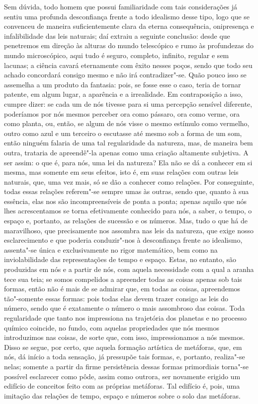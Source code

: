 Sem dúvida, todo homem que possui familiaridade com tais considerações
já sentiu uma profunda desconfiança frente a todo idealismo desse
tipo, logo que se convenceu de maneira suficientemente clara da eterna
consequência, onipresença e infalibilidade das leis naturais; daí 
extraiu a seguinte conclusão: desde que penetremos em direção às
alturas do mundo telescópico e rumo às profundezas do mundo
microscópico, aqui tudo é seguro, completo, infinito, regular e sem
lacunas; a ciência cavará eternamente com êxito nesses poços, sendo que
todo seu achado concordará consigo mesmo e não irá contradizer"-se.
Quão pouco isso se assemelha a um produto da fantasia: pois, se fosse
esse o caso, teria de tornar patente, em algum lugar, a aparência e a
irrealidade. Em contraposição a isso, cumpre dizer: se cada um de nós
tivesse para si uma percepção sensível diferente, poderíamos por nós
mesmos perceber ora como pássaro, ora como verme, ora como planta, ou,
então, se algum de nós visse o mesmo estímulo como vermelho, outro
como azul e um terceiro o escutasse até mesmo sob a forma de um som,
então ninguém falaria de uma tal regularidade da natureza, mas, de
maneira bem outra, trataria de apreendê"-la apenas como uma criação
altamente subjetiva. A ser assim: o que é, para nós, uma lei da
natureza? Ela não se dá a conhecer em si mesma, mas somente em seus
efeitos, isto é, em suas relações com outras leis naturais, que, uma
vez mais, só se dão a conhecer como relações. Por conseguinte, todas
essas relações referem"-se sempre umas às outras, sendo que, quanto à
sua essência, elas nos são incompreensíveis de ponta a ponta; apenas
aquilo que nós lhes acrescentamos se torna efetivamente conhecido para nós,
a saber, o tempo, o espaço e, portanto, as relações de sucessão e os
números. Mas, tudo o que há de maravilhoso, que precisamente nos
assombra nas leis da natureza, que exige nosso esclarecimento e que
poderia conduzir"-nos à desconfiança frente ao idealismo, assenta"-se
única e exclusivamente no rigor matemático, bem como na inviolabilidade
das representações de tempo e espaço. Estas, no entanto, são produzidas
em nós e a partir de nós, com aquela necessidade com a qual a aranha
tece sua teia; se somos compelidos a apreender todas as coisas apenas
sob tais formas, então não é mais de se admirar que, em todas as coisas,
apreendemos tão"-somente essas formas: pois todas elas devem trazer consigo
as leis do número, sendo que é exatamente o número o mais assombroso
das coisas. Toda regularidade que tanto nos impressiona na trajetória
dos planetas e no processo químico coincide, no fundo, com aquelas
propriedades que nós mesmos introduzimos nas coisas, de sorte que, com
isso, impressionamos a nós mesmos. Disso se segue, por certo, que
aquela formação artística de metáforas, que, em nós, dá início a toda
sensação, já pressupõe tais formas, e, portanto, realiza"-se nelas;
somente a partir da firme persistência dessas formas primordiais
torna"-se possível esclarecer como pôde, assim como outrora, ser
novamente erigido um edifício de conceitos feito com as próprias
metáforas. Tal edifício é, pois, uma imitação das relações de tempo,
espaço e números sobre o solo das metáforas.
\pagebreak

